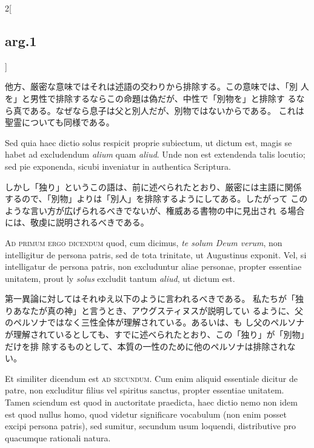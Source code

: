 \documentclass[paper=a4paper,fontsize=10pt,jafontsize=9pt,titlepage]{jlreq}
\begin{document}
\begin{paracol}{2}[\subsection{arg.1}]
\switchcolumn

他方、厳密な意味ではそれは述語の交わりから排除する。この意味では、「別
 人を」と男性で排除するならこの命題は偽だが、中性で「別物を」と排除す
 るなら真である。なぜなら息子は父と別人だが、別物ではないからである。
 これは聖霊についても同様である。

\switchcolumn*

Sed quia haec dictio solus
respicit proprie subiectum, ut dictum est, magis se habet ad
excludendum {\itshape alium} quam {\itshape aliud}. Unde non est extendenda talis locutio;
sed pie exponenda, sicubi inveniatur in authentica Scriptura.

\switchcolumn

しかし「独り」というこの語は、前に述べられたとおり、厳密には主語に関係
 するので、「別物」よりは「別人」を排除するようにしてある。したがって
 このような言い方が広げられるべきでないが、権威ある書物の中に見出され
 る場合には、敬虔に説明されるべきである。

\switchcolumn*[\subsection{ad.1}]

{\scshape Ad primum ergo dicendum} quod, cum dicimus, {\itshape te solum Deum verum}, non
intelligitur de persona patris, sed de tota trinitate, ut Augustinus
exponit. Vel, si intelligatur de persona patris, non excluduntur aliae
personae, propter essentiae unitatem, prout ly {\itshape solus} excludit tantum
{\itshape aliud}, ut dictum est.

\switchcolumn

第一異論に対してはそれゆえ以下のように言われるべきである。
私たちが「独りあなたが真の神」と言うとき、アウグスティヌスが説明してい
 るように、父のペルソナではなく三性全体が理解されている。あるいは、も
 し父のペルソナが理解されているとしても、すでに述べられたとおり、この「独り」が「別物」だけを排
 除するものとして、本質の一性のために他のペルソナは排除されない。

\switchcolumn*

Et similiter dicendum est {\scshape ad secundum}. Cum enim aliquid essentiale
dicitur de patre, non excluditur filius vel spiritus sanctus, propter
essentiae unitatem. Tamen sciendum est quod in auctoritate praedicta,
haec dictio nemo non idem est quod nullus homo, quod videtur
significare vocabulum (non enim posset excipi persona patris), sed
sumitur, secundum usum loquendi, distributive pro quacumque rationali
natura.


\end{paracol}
\end{document}
